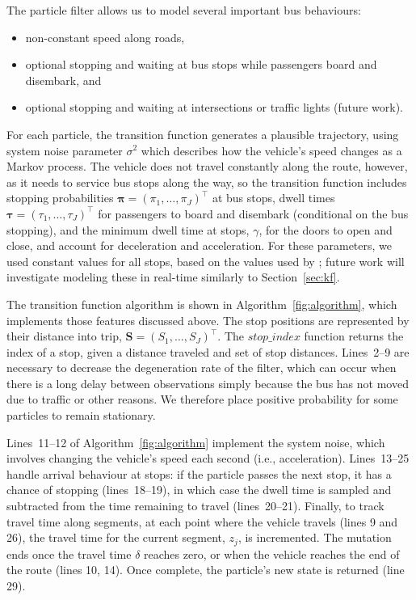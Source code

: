 The particle filter allows us to model several important bus behaviours:
\begin{itemize}
\item non-constant speed along roads,
\item optional stopping and waiting at bus stops while passengers board and disembark, and
\item optional stopping and waiting at intersections or traffic lights (future work).
\end{itemize}

For each particle, the transition function generates a plausible trajectory,
using system noise parameter $\sigma^2$ which describes 
how the vehicle's speed changes as a Markov process.
The vehicle does not travel constantly along the route,
however, as it needs to service bus stops along the way,
so the transition function includes 
stopping probabilities $\boldsymbol\pi = (\pi_1,\ldots,\pi_J)^\top$ at bus stops,
dwell times $\boldsymbol\tau = (\tau_1,\ldots,\tau_J)^\top$ for passengers to
board and disembark (conditional on the bus stopping),
and the minimum dwell time at stops, $\gamma$,
for the doors to open and close,
and account for deceleration and acceleration.
For these parameters, we used constant values for all stops,
based on the values used by \cite{Hans_2015};
future work will investigate modeling these in real-time similarly to Section~\ref{sec:kf}.

The transition function algorithm is shown in Algorithm~\ref{fig:algorithm},
which implements those features discussed above.
The stop positions are represented by their distance into trip,
$\boldsymbol{S} = (S_1, \ldots, S_J)^\top$.
The $stop\_index$ function returns the index of a stop,
given a distance traveled and set of stop distances.
Lines~2--9 are necessary to decrease the degeneration rate of the filter,
which can occur when there is a long delay between observations
simply because the bus has not moved due to traffic or other reasons. 
We therefore place positive probability for some particles to remain stationary.

Lines~11--12 of Algorithm~\ref{fig:algorithm} implement the system noise,
which involves changing the vehicle's speed each second (i.e., acceleration).
Lines~13--25 handle arrival behaviour at stops:
if the particle passes the next stop,
it has a chance of stopping (lines~18--19),
in which case the dwell time is sampled and subtracted from the 
time remaining to travel (lines~20--21).
Finally, to track travel time along segments,
at each point where the vehicle travels (lines 9 and 26),
the travel time for the current segment, $z_j$, is incremented.
The mutation ends once the travel time $\delta$ reaches zero,
or when the vehicle reaches the end of the route (lines 10, 14).
Once complete, the particle's new state is returned (line 29).

